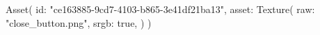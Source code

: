 Asset(
    id: "{ce163885-9cd7-4103-b865-3e41df21ba13}",
    asset: Texture(
        raw:  "close_button.png",
        srgb: true,
    )
)
